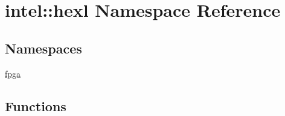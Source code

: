 \hypertarget{namespaceintel_1_1hexl}{\section{intel\-:\-:hexl Namespace Reference}
\label{namespaceintel_1_1hexl}
}
\subsection*{Namespaces}
\begin{DoxyCompactItemize}
\item 
\hyperlink{namespaceintel_1_1hexl_1_1fpga}{fpga}
\end{DoxyCompactItemize}
\subsection*{Functions}
